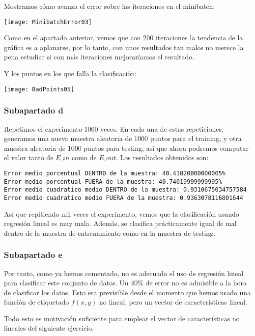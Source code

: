 \documentclass[11pt]{article}
\begin{document}
Mostramos cómo avanza el error sobre las iteraciones en el minibatch:

\texttt{[image: MinibatchError03]}

Como en el apartado anterior, vemos que con 200 iteraciones la tendencia de la gráfica es a aplanarse, por lo tanto, con unos resultados tan malos no merece la pena estudiar si con más iteraciones mejoraríamos el resultado.

Y los puntos en los que falla la clasificación:

\texttt{[image: BadPoints05]}

\subsubsection{Subapartado d}

Repetimos el experimento 1000 veces. En cada una de estas repeticiones, generamos una nueva muestra aleatoria de 1000 puntos para el training, y otra muestra aleatoria de 1000 puntos para testing, así que ahora podremos computar el valor tanto de $E\_in$ como de $E\_out$. Los resultados obtenidos son:

\begin{lstlisting}
Error medio porcentual DENTRO de la muestra: 40.41820000000005%
Error medio porcentual FUERA de la muestra: 40.74019999999995%
Error medio cuadratico medio DENTRO de la muestra: 0.9310675034757584
Error medio cuadratico medio FUERA de la muestra: 0.9363078116801644
\end{lstlisting}

Así que repitiendo mil veces el experimento, vemos que la clasificación usando regresión lineal es muy mala. Además, se clasifica prácticamente igual de mal dentro de la muestra de entrenamiento como en la muestra de testing.

\subsubsection{Subapartado e}

Por tanto, como ya hemos comentado, no es adecuado el uso de regresión lineal para clasificar este conjunto de datos. Un 40\% de error no es admisible a la hora de clasificar los datos. Esto era previsible desde el momento que hemos usado una función de etiquetado $f(x,y)$ no lineal, pero un vector de características lineal.

Todo esto es motivación suficiente para emplear el vector de características no lineales del siguiente ejercicio.
\end{document}

